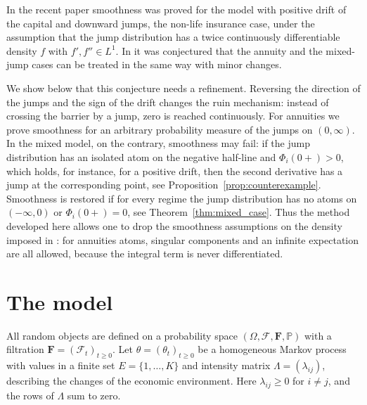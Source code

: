 \documentclass[smallextended]{svjour3}
\newcommand{\bbp}{\mathbb{P}}
\newcommand{\cF}{\mathcal{F}}
\begin{document}
In the recent paper \cite[Theorem~1]{AntipovKabanov} smoothness was proved for
the model with positive drift of the capital and downward jumps, the non-life
insurance case, under the assumption that the jump distribution has a twice
continuously differentiable density $f$ with $f',f''\in L^1$. In
\cite[Remark~1]{AntipovKabanov} it was conjectured that the annuity and the
mixed-jump cases can be treated in the same way with minor changes.

We show below that this conjecture needs a refinement. Reversing the direction
of the jumps and the sign of the drift changes the ruin mechanism: instead of
crossing the barrier by a jump, zero is reached continuously. For annuities we
prove smoothness for an arbitrary probability measure of the jumps on
$(0,\infty)$. In the mixed model, on the contrary, smoothness may fail: if the
jump distribution has an isolated atom on the negative half-line and
$\Phi_i(0+)>0$, which holds, for instance, for a positive drift, then the
second derivative has a jump at the corresponding point,
see Proposition~\ref{prop:counterexample}. Smoothness is restored if for every
regime the jump distribution has no atoms on $(-\infty,0)$ or $\Phi_i(0+)=0$,
see Theorem~\ref{thm:mixed_case}. Thus the method developed here allows one to
drop the smoothness assumptions on the density imposed in
\cite[Theorem~1]{AntipovKabanov}: for annuities atoms, singular components and
an infinite expectation are all allowed, because the integral term is never
differentiated.

\section{The model}
\label{s2}

All random objects are defined on a probability space
$(\Omega,\cF,\mathbf{F},\bbp)$ with a filtration
$\mathbf{F}=(\cF_t)_{t\ge0}$. Let $\theta=(\theta_t)_{t\ge0}$ be a homogeneous
Markov process with values in a finite set $E=\{1,\dots,K\}$ and intensity
matrix $\Lambda=(\lambda_{ij})$, describing the changes of the economic
environment. Here $\lambda_{ij}\ge0$ for $i\ne j$, and the rows of $\Lambda$
sum to zero.
\end{document}
